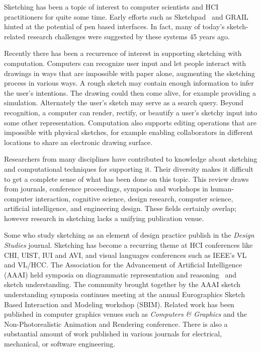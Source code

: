 Sketching has been a topic of interest to computer scientists and HCI
practitioners for quite some time. Early efforts such as
Sketchpad~\cite{sutherland-sketchpad} and GRAIL~\cite{ellis-grail}
hinted at the potential of pen based interfaces. In fact, many of
today's sketch-related research challenges were suggested by these
systems 45 years ago.

Recently there has been a recurrence of interest in supporting
sketching with computation. Computers can recognize user input and let
people interact with drawings in ways that are impossible with paper
alone, augmenting the sketching process in various ways. A rough
sketch may contain enough information to infer the user's
intentions. The drawing could then come alive, for example providing a
simulation. Alternately the user's sketch may serve as a search
query. Beyond recognition, a computer can render, rectify, or beautify
a user's sketchy input into some other representation. Computation
also supports editing operations that are impossible with physical
sketches, for example enabling collaborators in different locations to
share an electronic drawing surface.

Researchers from many disciplines have contributed to knowledge about
sketching and computational techniques for supporting it. Their
diversity makes it difficult to get a complete sense of what has been
done on this topic. This review draws from journals, conference
proceedings, symposia and workshops in human-computer interaction,
cognitive science, design research, computer science, artificial
intelligence, and engineering design. These fields certainly overlap;
however research in sketching lacks a unifying publication venue.

Some who study sketching as an element of design practice publish in
the \textit{Design Studies} journal. Sketching has become a recurring
theme at HCI conferences like CHI, UIST, IUI and AVI, and visual
languages conferences such as IEEE's VL and VL/HCC. The Association
for the Advancement of Artificial Intelligence (AAAI) held symposia on
diagrammatic representation and reasoning~\cite{glasgow-diagrams} and
sketch understanding. The community brought together by the AAAI
sketch understanding symposia continues meeting at the annual
Eurographics Sketch Based Interaction and Modeling workshop
(SBIM). Related work has been published in computer graphics venues
such as \textit{Computers \& Graphics} and the Non-Photorealistic
Animation and Rendering conference.  There is also a substantial
amount of work published in various journals for electrical,
mechanical, or software engineering.

